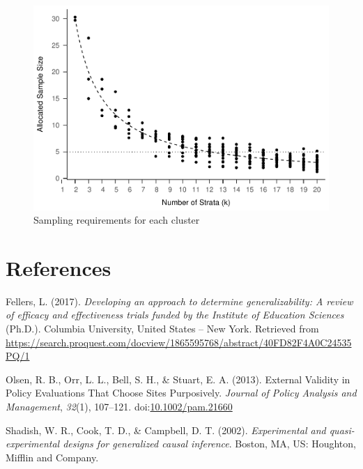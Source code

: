 \documentclass[,man]{apa6}
\theoremstyle{definition}
\theoremstyle{definition}
\theoremstyle{definition}
\theoremstyle{remark}
\begin{document}
\begin{figure}
\centering
\includegraphics{Method_files/figure-latex/k-size-full-1.pdf}
\caption{\label{fig:k-size-full}Sampling requirements for each cluster}
\end{figure}

\newpage

\hypertarget{references}{%
\section{References}\label{references}}

\begingroup
\setlength{\parindent}{-0.5in}
\setlength{\leftskip}{0.5in}

\hypertarget{refs}{}
\leavevmode\hypertarget{ref-fellersDevelopingApproachDetermine2017}{}%
Fellers, L. (2017). \emph{Developing an approach to determine
generalizability: A review of efficacy and effectiveness trials funded
by the Institute of Education Sciences} (Ph.D.). Columbia University,
United States -- New York. Retrieved from
\url{https://search.proquest.com/docview/1865595768/abstract/40FD82F4A0C24535PQ/1}

\leavevmode\hypertarget{ref-olsenExternalValidityPolicy2013}{}%
Olsen, R. B., Orr, L. L., Bell, S. H., \& Stuart, E. A. (2013). External
Validity in Policy Evaluations That Choose Sites Purposively.
\emph{Journal of Policy Analysis and Management}, \emph{32}(1),
107--121.
doi:\href{https://doi.org/10.1002/pam.21660}{10.1002/pam.21660}

\leavevmode\hypertarget{ref-shadishExperimentalQuasiexperimentalDesigns2002}{}%
Shadish, W. R., Cook, T. D., \& Campbell, D. T. (2002).
\emph{Experimental and quasi-experimental designs for generalized causal
inference}. Boston, MA, US: Houghton, Mifflin and Company.
\end{document}
